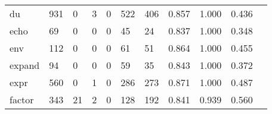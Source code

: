\begin{longtable}{lp{1.2cm}p{1.2cm}p{1.2cm}p{1.2cm}p{1.2cm}p{1.2cm}p{1.2cm}p{1.2cm}p{1.2cm}p{1.2cm}}
du        &                                   931 &                                                  0 &                                                  3 &                                                  0 &                                                522 &                                                406 &                                              0.857 &                                              1.000 &                                              0.436 \\
echo      &                                    69 &                                                  0 &                                                  0 &                                                  0 &                                                 45 &                                                 24 &                                              0.837 &                                              1.000 &                                              0.348 \\
env       &                                   112 &                                                  0 &                                                  0 &                                                  0 &                                                 61 &                                                 51 &                                              0.864 &                                              1.000 &                                              0.455 \\
expand    &                                    94 &                                                  0 &                                                  0 &                                                  0 &                                                 59 &                                                 35 &                                              0.843 &                                              1.000 &                                              0.372 \\
expr      &                                   560 &                                                  0 &                                                  1 &                                                  0 &                                                286 &                                                273 &                                              0.871 &                                              1.000 &                                              0.487 \\
factor    &                                   343 &                                                 21 &                                                  2 &                                                  0 &                                                128 &                                                192 &                                              0.841 &                                              0.939 &                                              0.560 \\

\end{longtable}
